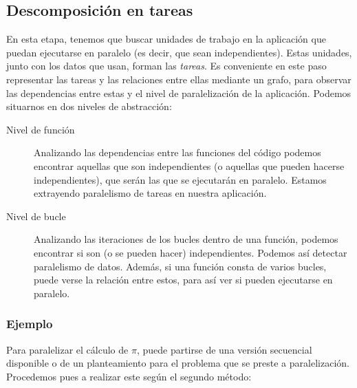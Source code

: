\subsection{Descomposición en tareas} 
En esta etapa, tenemos que buscar unidades de trabajo en la aplicación que puedan ejecutarse en paralelo (es decir, que sean independientes). Estas unidades, junto con los datos que usan, forman las \emph{tareas}. Es conveniente en este paso representar las tareas y las relaciones entre ellas mediante un grafo, para observar las dependencias entre estas y el nivel de paralelización de la aplicación. Podemos situarnos en dos niveles de abstracción:
\begin{description}
    \item [Nivel de función] Analizando las dependencias entre las funciones del código podemos encontrar aquellas que son independientes (o aquellas que pueden hacerse independientes), que serán las que se ejecutarán en paralelo. Estamos extrayendo paralelismo de tareas en nuestra aplicación.
    \item [Nivel de bucle] Analizando las iteraciones de los bucles dentro de una función, podemos encontrar si son (o se pueden hacer) independientes. Podemos así detectar paralelismo de datos. Además, si una función consta de varios bucles, puede verse la relación entre estos, para así ver si pueden ejecutarse en paralelo.
\end{description}

\subsubsection{Ejemplo} 
Para paralelizar el cálculo de $\pi$, puede partirse de una versión secuencial disponible o de un planteamiento para el problema que se preste a paralelización. Procedemos pues a realizar este según el segundo método:


